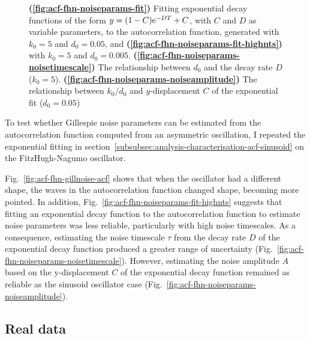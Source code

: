 \begin{figure}
  \caption{
    \textbf{(\ref{fig:acf-fhn-noiseparams-fit})}
    Fitting exponential decay functions of the form $y = (1-C)\mathrm{e}^{-DT}+C$, with $C$ and $D$ as variable parameters, to the autocorrelation function, generated with $k_{0}=5$ and $d_{0}=0.05$, and
    \textbf{(\ref{fig:acf-fhn-noiseparams-fit-highnts})}
    with $k_{0}=5$ and $d_{0}=0.005$.
    \textbf{(\ref{fig:acf-fhn-noiseparams-noisetimescale})}
    The relationship between $d_{0}$ and the decay rate $D$ ($k_{0}=5$).
    \textbf{(\ref{fig:acf-fhn-noiseparams-noiseamplitude})}
    The relationship between $k_{0}/d_{0}$ and $y$-displacement $C$ of the exponential fit ($d_{0}=0.05$)
  }
  \label{fig:acf-fhn-noiseparams}
\end{figure}

To test whether Gillespie noise parameters can be estimated from the autocorrelation function computed from an asymmetric oscillation, I repeated the exponential fitting in section~\ref{subsubsec:analysis-characterisation-acf-sinusoid} on the FitzHugh-Nagumo oscillator.

Fig.\ \ref{fig:acf-fhn-gillnoise-acf} shows that when the oscillator had a different shape, the waves in the autocorrelation function changed shape, becoming more pointed.
In addition, Fig.\ \ref{fig:acf-fhn-noiseparams-fit-highnts} suggests that fitting an exponential decay function to the autocorrelation function to estimate noise parameters was less reliable, particularly with high noise timescales.
As a consequence, estimating the noise timescale $\tau$ from the decay rate $D$ of the exponential decay function produced a greater range of uncertainty (Fig.\ \ref{fig:acf-fhn-noiseparams-noisetimescale}).
However, estimating the noise amplitude $A$ based on the y-displacement $C$ of the exponential decay function remained as reliable as the sinusoid oscillator case (Fig.\ \ref{fig:acf-fhn-noiseparams-noiseamplitude}).


\subsection{Real data}
\label{subsubsec:analysis-characterisation-real}

